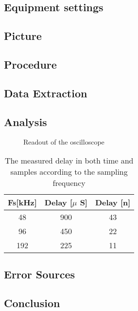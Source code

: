 \subsection{Equipment settings}

\subsection{Picture}

\subsection{Procedure}

\subsection{Data Extraction}

\subsection{Analysis}

\begin{figure}[H]
	\centering
	
	\caption{Readout of the oscilloscope}
	\label{fig:SchematicDelayExperiment}
\end{figure}


\begin{table}[H]
	\centering
	\begin{tabular}{ccc}
		Fs[kHz] & Delay [$\mu$ S] & Delay [n] \\ \hline \hline
		48 & 900 & 43 \\ 
		96 & 450 & 22 \\ 
		192 & 225 & 11
	\end{tabular} 
	\caption{The measured delay in both time and samples according to the sampling frequency}
	\label{tab:DelayResults}
\end{table}





\subsection{Error Sources}

\subsection{Conclusion}
